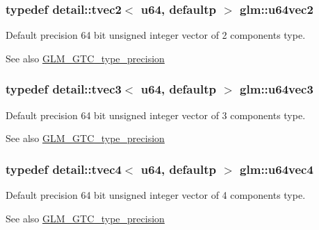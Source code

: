 \subsubsection[{\texorpdfstring{u64vec2}{u64vec2}}]{\setlength{\rightskip}{0pt plus 5cm}typedef detail\+::tvec2$<$ u64, defaultp $>$ {\bf glm\+::u64vec2}}\hypertarget{group__gtc__type__precision_gaffa78d655fd98b33e47043e2bd38641b}{}\label{group__gtc__type__precision_gaffa78d655fd98b33e47043e2bd38641b}
Default precision 64 bit unsigned integer vector of 2 components type. \begin{DoxySeeAlso}{See also}
\hyperlink{group__gtc__type__precision}{G\+L\+M\+\_\+\+G\+T\+C\+\_\+type\+\_\+precision} 
\end{DoxySeeAlso}
\subsubsection[{\texorpdfstring{u64vec3}{u64vec3}}]{\setlength{\rightskip}{0pt plus 5cm}typedef detail\+::tvec3$<$ u64, defaultp $>$ {\bf glm\+::u64vec3}}\hypertarget{group__gtc__type__precision_gae934e74663d832989066cc852560866d}{}\label{group__gtc__type__precision_gae934e74663d832989066cc852560866d}
Default precision 64 bit unsigned integer vector of 3 components type. \begin{DoxySeeAlso}{See also}
\hyperlink{group__gtc__type__precision}{G\+L\+M\+\_\+\+G\+T\+C\+\_\+type\+\_\+precision} 
\end{DoxySeeAlso}
\subsubsection[{\texorpdfstring{u64vec4}{u64vec4}}]{\setlength{\rightskip}{0pt plus 5cm}typedef detail\+::tvec4$<$ u64, defaultp $>$ {\bf glm\+::u64vec4}}\hypertarget{group__gtc__type__precision_ga59d78a1ff6d275bbb425dce92f607b9c}{}\label{group__gtc__type__precision_ga59d78a1ff6d275bbb425dce92f607b9c}
Default precision 64 bit unsigned integer vector of 4 components type. \begin{DoxySeeAlso}{See also}
\hyperlink{group__gtc__type__precision}{G\+L\+M\+\_\+\+G\+T\+C\+\_\+type\+\_\+precision} 
\end{DoxySeeAlso}
